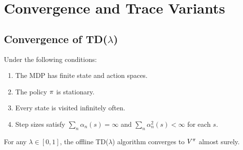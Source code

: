 \documentclass[11pt,a4paper]{article}
\begin{document}
\section{Convergence and Trace Variants}
\label{sec:convergence_variants}

\subsection{Convergence of TD($\lambda$)}
\label{subsec:convergence}

\begin{corollary}
\label{cor:td_lambda_convergence}
Under the following conditions:
\begin{enumerate}[nosep]
  \item The MDP has finite state and action spaces.
  \item The policy $\pi$ is stationary.
  \item Every state is visited infinitely often.
  \item Step sizes satisfy $\sum_n \alpha_n(s) = \infty$ and
    $\sum_n \alpha_n^2(s) < \infty$ for each $s$.
\end{enumerate}
For any $\lambda \in [0,1]$, the offline TD($\lambda$) algorithm
converges to $V^{\pi}$ almost surely.
\end{corollary}
\end{document}
